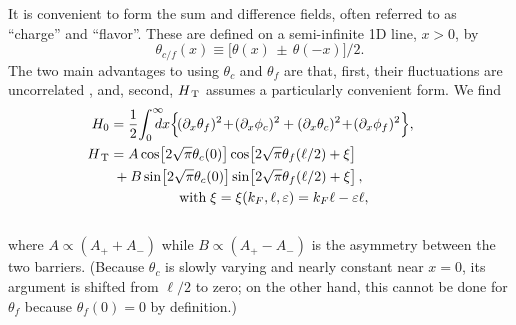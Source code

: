 \documentclass[aps,prb,reprint,floatfix,superscriptaddress,amssymb,amsmath]{revtex4-2}
\newcommand{\HT}{H_\text{\,T}}
\begin{document}
It is convenient to form the sum and difference fields, often referred to as ``charge'' and ``flavor''. These are defined on a semi-infinite 1D line, $x>0$, by
\begin{equation}
\theta_{c/f}(x) \equiv \big[ \theta(x) \,\pm\, \theta(-x) \big]/2  .
\label{eq:1d_cf_fields}
\end{equation}
The two main advantages to using $\theta_c$ and $\theta_f$ are that, first, their fluctuations are uncorrelated \cite{FendleyPRB95}, and, second, $\HT$ assumes a particularly convenient form. We find 
\begin{subequations}
\begin{align}
 H_0  & = \frac{1}{2} \!\int_0^\infty \!\!\!\!\!dx 
\Big\{ \!(\partial_x {\theta_f})^2 \!+\! (\partial_x {\phi_c})^2 +  (\partial_x {\theta_c})^2 \!+\! (\partial_x {\phi_f})^2
\Big\} , \quad\;
\label{eq:H0_strong3}\\%
\HT  &= A \cos\!\left[2\sqrt{\pi}\theta_c(0)\right] \cos\!\left[ 2\sqrt{\pi}\theta_f(\ell/2) + \xi \right]
\label{eq:HT_boson3a}\\
& \; + B \sin\!\left[2\sqrt{\pi}\theta_c(0)\right] \sin\!\left[ 2\sqrt{\pi}\theta_f(\ell/2) + \xi \right],
\label{eq:HT_boson3b}\\
&\qquad\qquad\quad \text{with}\; \xi=\xi(k_F,\ell,\varepsilon)=k_F\ell - \varepsilon\ell ,
\label{eq:def-xi} 
\end{align}
\label{eq:Hboson3}
\end{subequations}\vspace*{-0.3cm}\\
where $A \!\propto\! (A_+ + A_-)$ while $B \!\propto\! (A_+ - A_-)$ is the asymmetry between the two barriers. (Because $\theta_c$ is slowly varying and nearly constant near $x\!=\!0$, its argument is shifted from $\ell/2$ to zero; on the other hand, this cannot be done for $\theta_f$ because $\theta_f(0)\!=\!0$ by definition.) 
\end{document}
